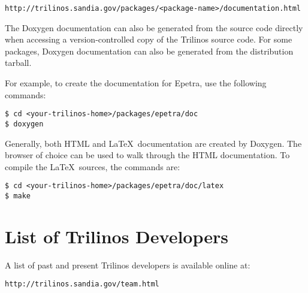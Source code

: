 \begin{verbatim}
http://trilinos.sandia.gov/packages/<package-name>/documentation.html
\end{verbatim}

The Doxygen documentation can also be generated from the source code directly
when accessing a version-controlled copy of the Trilinos source code.  For
some packages, Doxygen documentation can also be generated from the 
distribution tarball.

 For example, to create
the documentation for Epetra, use the following commands:
\begin{verbatim}
$ cd <your-trilinos-home>/packages/epetra/doc
$ doxygen
\end{verbatim}
Generally, both HTML and \LaTeX~documentation are created by Doxygen.
The browser of choice can be used to walk through the HTML
documentation.  To compile the \LaTeX~sources, the commands are:
\begin{verbatim}
$ cd <your-trilinos-home>/packages/epetra/doc/latex
$ make
\end{verbatim}


\section{List of Trilinos Developers}
\label{sec:intro_incomplete}

A list of past and present Trilinos developers is available online at:
\begin{verbatim}
http://trilinos.sandia.gov/team.html
\end{verbatim}


